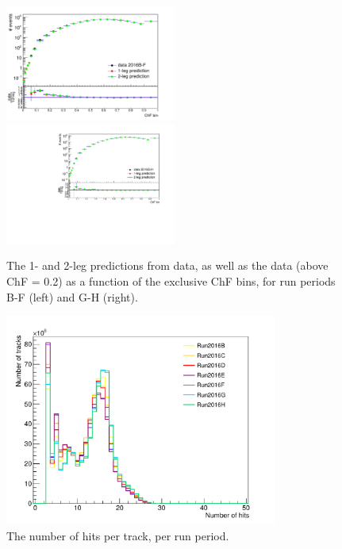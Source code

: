 \begin{figure}[h]
  \centering
  \includegraphics[width=0.5\textwidth]{figures/data_vs_prediction_BF_filters.pdf}\hfill%
  \includegraphics[width=0.5\textwidth]{figures/data_vs_prediction_GH_filters.pdf}
  \caption{The 1- and 2-leg predictions from data, as well as the data (above ChF = 0.2) as a function of the exclusive ChF bins, for run periods B-F (left) and G-H (right).}
  \label{fig:prediction}
\end{figure}

\begin{figure}[h]
  \centering
  \includegraphics[width=0.8\textwidth]{figures/nhits_perRunPeriod.pdf}\hfill%
  \caption{The number of hits per track, per run period.}
  \label{fig:nhits}
\end{figure}

